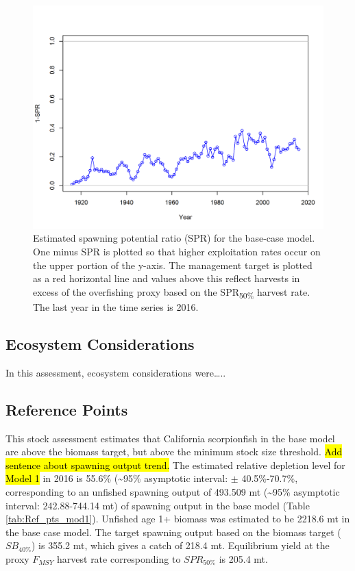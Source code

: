 \documentclass[12pt,]{article}
\begin{document}
\begin{figure}[htbp]
\centering
\includegraphics{r4ss/plots_mod1/SPR2_minusSPRseries.png}
\caption{Estimated spawning potential ratio (SPR) for the base-case
model. One minus SPR is plotted so that higher exploitation rates occur
on the upper portion of the y-axis. The management target is plotted as
a red horizontal line and values above this reflect harvests in excess
of the overfishing proxy based on the SPR\textsubscript{50\%} harvest
rate. The last year in the time series is 2016. \label{fig:SPR_all}}
\end{figure}

\FloatBarrier

\subsection*{Ecosystem Considerations}\label{ecosystem-considerations}

In this assessment, ecosystem considerations were\ldots{}..

\subsection*{Reference Points}\label{reference-points}

This stock assessment estimates that California scorpionfish in the base
model are above the biomass target, but above the minimum stock size
threshold. \hl{Add sentence about spawning output trend.} The estimated
relative depletion level for \hl{Model 1} in 2016 is 55.6\%
(\textasciitilde{}95\% asymptotic interval: \(\pm\) 40.5\%-70.7\%,
corresponding to an unfished spawning output of 493.509 mt
(\textasciitilde{}95\% asymptotic interval: 242.88-744.14 mt) of
spawning output in the base model (Table \ref{tab:Ref_pts_mod1}).
Unfished age 1+ biomass was estimated to be 2218.6 mt in the base case
model. The target spawning output based on the biomass target
(\(SB_{40\%}\)) is 355.2 mt, which gives a catch of 218.4 mt.
Equilibrium yield at the proxy \(F_{MSY}\) harvest rate corresponding to
\(SPR_{50\%}\) is 205.4 mt.
\end{document}
